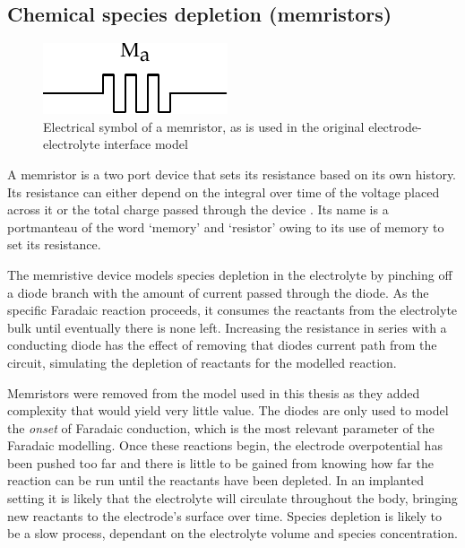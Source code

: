   \subsection{Chemical species depletion (memristors)}


    \begin{figure}[h]
      \centering
      \includegraphics{content/pt2/07-InterfaceModel/graphics/memristorSymbol}
      \caption{\label{fig:pt2-memristorSymbol}Electrical symbol of a memristor, as is used in the original electrode-electrolyte interface model}
    \end{figure}

    A memristor is a two port device that sets its resistance based on its own history.
    Its resistance can either depend on the integral over time of the voltage placed across it or the total charge passed through the device \cite{Kvatinsky2012}.
    Its name is a portmanteau of the word `memory' and `resistor' owing to its use of memory to set its resistance.

    The memristive device models species depletion in the electrolyte by pinching off a diode branch with the amount of current passed through the diode.
    As the specific Faradaic reaction proceeds, it consumes the reactants from the electrolyte bulk until eventually there is none left.
    Increasing the resistance in series with a conducting diode has the effect of removing that diodes current path from the circuit, simulating the depletion of reactants for the modelled reaction.

    Memristors were removed from the model used in this thesis as they added complexity that would yield very little value.
    The diodes are only used to model the \emph{onset} of Faradaic conduction, which is the most relevant parameter of the Faradaic modelling.
    Once these reactions begin, the electrode overpotential has been pushed too far and there is little to be gained from knowing how far the reaction can be run until the reactants have been depleted.
    In an implanted setting it is likely that the electrolyte will circulate throughout the body, bringing new reactants to the electrode's surface over time.
    Species depletion is likely to be a slow process, dependant on the electrolyte volume and species concentration.

